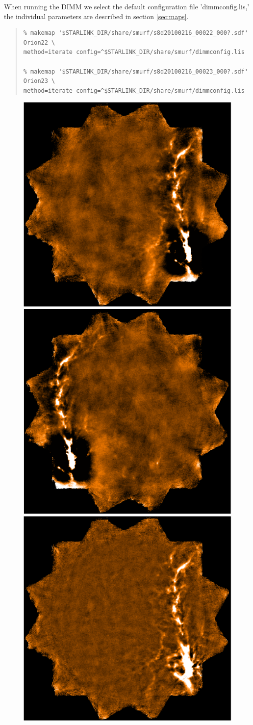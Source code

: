 \documentclass[twoside,11pt]{article}
\renewcommand{\_}{\texttt{\symbol{95}}}
\newenvironment{myquote}{\begin{quote}\begin{small}}{\end{small}\end{quote}}
\begin{document}
When running the DIMM we select the default configuration file
'dimmconfig.lis,' the individual parameters are described in section
\ref{sec:maps}.

\begin{myquote}
\begin{verbatim}
% makemap '$STARLINK_DIR/share/smurf/s8d20100216_00022_000?.sdf' Orion22 \
method=iterate config=^$STARLINK_DIR/share/smurf/dimmconfig.lis

% makemap '$STARLINK_DIR/share/smurf/s8d20100216_00023_000?.sdf' Orion23 \
method=iterate config=^$STARLINK_DIR/share/smurf/dimmconfig.lis
\end{verbatim}
\end{myquote}

\begin{figure}
\begin{center}
\includegraphics[width=0.49\hsize]{sc19_map22.eps}
\includegraphics[width=0.49\hsize]{sc19_map23.eps}
\includegraphics[width=0.49\hsize]{sc19_map22_back.eps}

\end{center}
\end{figure}
\end{document}

